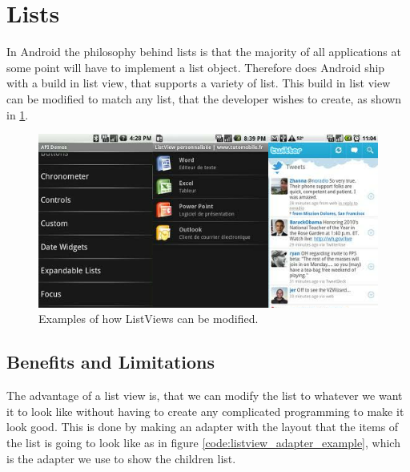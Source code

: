 \section{Lists}
In Android the philosophy behind lists is that the majority of all applications at some point will have to implement a list object.
Therefore does Android ship with a build in list view, that supports a variety of list.
This build in list view can be modified to match any list, that the developer wishes to create, as shown in \ref{fig:listview_example}.

\begin{figure}[H]
	\centering
		\includegraphics[width=\textwidth]{Images/Implementation/listview_example.png}
	\caption{Examples of how ListViews can be modified.}
	\label{fig:listview_example}
\end{figure}

\subsection{Benefits and Limitations}
The advantage of a list view is, that we can modify the list to whatever we want it to look like without having to create any complicated programming to make it look good.
This is done by making an adapter with the layout that the items of the list is going to look like as in figure \ref{code:listview_adapter_example}, which is the adapter we use to show the children list.

